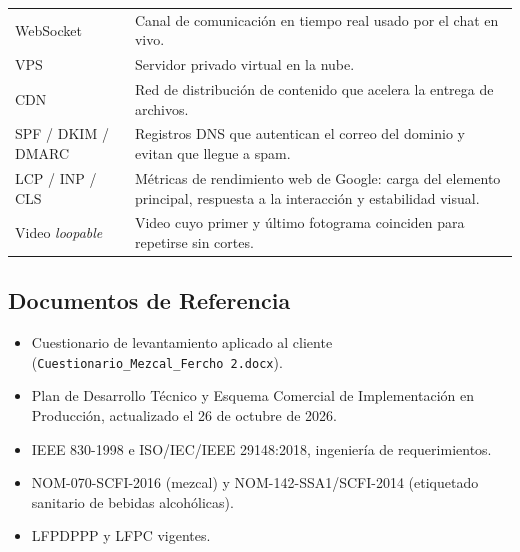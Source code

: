 \documentclass[11pt,letterpaper]{article}
\begin{document}
\begin{longtable}{@{} >{\raggedright\arraybackslash}p{3.4cm} >{\raggedright\arraybackslash}p{12.4cm} @{}}
WebSocket & Canal de comunicación en tiempo real usado por el chat en vivo. \\
VPS & Servidor privado virtual en la nube. \\
CDN & Red de distribución de contenido que acelera la entrega de archivos. \\
SPF / DKIM / DMARC & Registros DNS que autentican el correo del dominio y evitan que llegue a spam. \\
LCP / INP / CLS & Métricas de rendimiento web de Google: carga del elemento principal, respuesta a la interacción y estabilidad visual. \\
Video \textit{loopable} & Video cuyo primer y último fotograma coinciden para repetirse sin cortes. \\
\bottomrule
\end{longtable}

\subsection{Documentos de Referencia}
\begin{itemize}[leftmargin=1.5em]
    \item Cuestionario de levantamiento aplicado al cliente (\texttt{Cuestionario\_Mezcal\_Fercho 2.docx}).
    \item Plan de Desarrollo Técnico y Esquema Comercial de Implementación en Producción, actualizado el 26 de octubre de 2026.
    \item IEEE 830-1998 e ISO/IEC/IEEE 29148:2018, ingeniería de requerimientos.
    \item NOM-070-SCFI-2016 (mezcal) y NOM-142-SSA1/SCFI-2014 (etiquetado sanitario de bebidas alcohólicas).
    \item LFPDPPP y LFPC vigentes.
\end{itemize}
\end{document}
